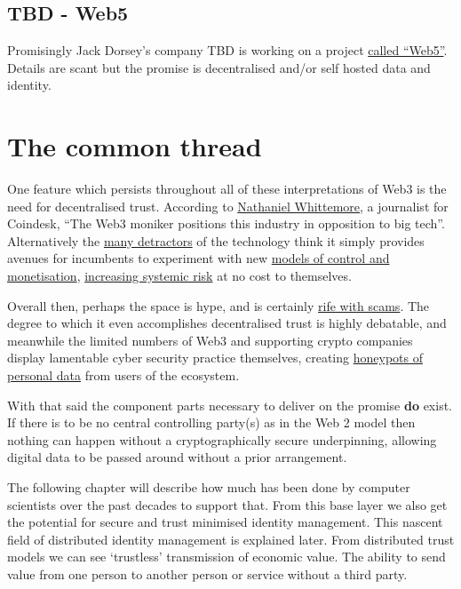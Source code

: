 \subsection{TBD - Web5}
Promisingly Jack Dorsey's company TBD is working on a project \href{https://developer.tbd.website/projects/web5/}{called ``Web5''}. Details are scant but the promise is decentralised and/or self hosted data and identity.
\section{The common thread}
One feature which persists throughout all of these interpretations of Web3 is the need for decentralised trust. According to \href{https://www.coindesk.com/podcasts/the-breakdown-with-nlw/yesterdays-hearing-was-cryptos-most-positive-interaction-with-the-us-government-ever/}{Nathaniel Whittemore}, a journalist for Coindesk, ``The Web3 moniker positions this industry in opposition to big tech''. Alternatively the \href{https://cryptocriticscorner.com/}{many detractors} of the technology think it simply provides avenues for incumbents to experiment with new \href{https://www.cigionline.org/articles/amid-the-hype-over-web3-informed-skepticism-is-critical/}{models of control and monetisation}, \href{https://newsletters.theatlantic.com/galaxy-brain/624cb2ebdc551a00208c1524/crypto-bubble-web3-decentralized-finance/}{increasing systemic risk} at no cost to themselves.\par %
Overall then, perhaps the space is hype, and is certainly \href{https://web3isgoinggreat.com/}{rife with scams}. The degree to which it even accomplishes decentralised trust is highly debatable, and meanwhile the limited numbers of Web3 and supporting crypto companies display lamentable cyber security practice themselves, creating \href{https://www.coindesk.com/tag/data-breaches/}{honeypots of personal data} from users of the ecosystem.\par
With that said the component parts necessary to deliver on the promise \textbf{do} exist. If there is to be no central controlling party(s) as in the Web 2 model then nothing can happen without a cryptographically secure underpinning, allowing digital data to be passed around without a prior arrangement.\par%
The following chapter will describe how much has been done by computer scientists over the past decades to support that. From this base layer we also get the potential for secure and trust minimised identity management. This nascent field of distributed identity management is explained later. From distributed trust models we can see `trustless' transmission of economic value. The ability to send value from one person to another person or service without a third party. \par
